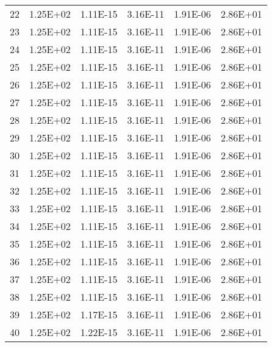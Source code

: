 \documentclass[12pt]{article}
\begin{document}
\begin{table}[htbp]
\begin{tabular}{rrrrrr}
    22    & 1.25E+02 & 1.11E-15 & 3.16E-11 & 1.91E-06 & 2.86E+01 \\
    23    & 1.25E+02 & 1.11E-15 & 3.16E-11 & 1.91E-06 & 2.86E+01 \\
    24    & 1.25E+02 & 1.11E-15 & 3.16E-11 & 1.91E-06 & 2.86E+01 \\
    25    & 1.25E+02 & 1.11E-15 & 3.16E-11 & 1.91E-06 & 2.86E+01 \\
    26    & 1.25E+02 & 1.11E-15 & 3.16E-11 & 1.91E-06 & 2.86E+01 \\
    27    & 1.25E+02 & 1.11E-15 & 3.16E-11 & 1.91E-06 & 2.86E+01 \\
    28    & 1.25E+02 & 1.11E-15 & 3.16E-11 & 1.91E-06 & 2.86E+01 \\
    29    & 1.25E+02 & 1.11E-15 & 3.16E-11 & 1.91E-06 & 2.86E+01 \\
    30    & 1.25E+02 & 1.11E-15 & 3.16E-11 & 1.91E-06 & 2.86E+01 \\
    31    & 1.25E+02 & 1.11E-15 & 3.16E-11 & 1.91E-06 & 2.86E+01 \\
    32    & 1.25E+02 & 1.11E-15 & 3.16E-11 & 1.91E-06 & 2.86E+01 \\
    33    & 1.25E+02 & 1.11E-15 & 3.16E-11 & 1.91E-06 & 2.86E+01 \\
    34    & 1.25E+02 & 1.11E-15 & 3.16E-11 & 1.91E-06 & 2.86E+01 \\
    35    & 1.25E+02 & 1.11E-15 & 3.16E-11 & 1.91E-06 & 2.86E+01 \\
    36    & 1.25E+02 & 1.11E-15 & 3.16E-11 & 1.91E-06 & 2.86E+01 \\
    37    & 1.25E+02 & 1.11E-15 & 3.16E-11 & 1.91E-06 & 2.86E+01 \\
    38    & 1.25E+02 & 1.11E-15 & 3.16E-11 & 1.91E-06 & 2.86E+01 \\
    39    & 1.25E+02 & 1.17E-15 & 3.16E-11 & 1.91E-06 & 2.86E+01 \\
    40    & 1.25E+02 & 1.22E-15 & 3.16E-11 & 1.91E-06 & 2.86E+01 \\
    \bottomrule
    \end{tabular}%
  \label{tab:addlabel}%
\end{table}%
\end{document}
